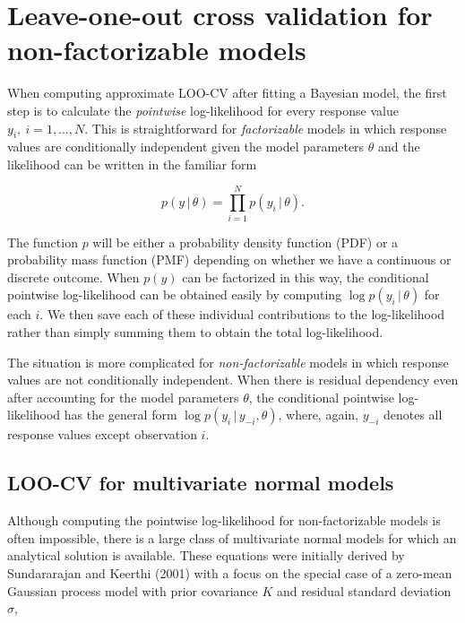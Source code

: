 \documentclass[english,,doc,floatsintext]{apa6}
\theoremstyle{definition}
\theoremstyle{definition}
\theoremstyle{definition}
\theoremstyle{remark}
\begin{document}
\hypertarget{nf-loo-cv}{%
\section{Leave-one-out cross validation for non-factorizable
models}\label{nf-loo-cv}}

When computing approximate LOO-CV after fitting a Bayesian model, the
first step is to calculate the \emph{pointwise} log-likelihood for every
response value \(y_i, \: i = 1, \ldots, N\). This is straightforward for
\emph{factorizable} models in which response values are conditionally
independent given the model parameters \(\theta\) and the likelihood can
be written in the familiar form

\begin{equation}
p(y \,|\, \theta) = \prod_{i=1}^N p(y_i \,|\, \theta).
\end{equation}

The function \(p\) will be either a probability density function (PDF)
or a probability mass function (PMF) depending on whether we have a
continuous or discrete outcome. When \(p(y)\) can be factorized in this
way, the conditional pointwise log-likelihood can be obtained easily by
computing \(\log p(y_i \,|\, \theta)\) for each \(i\). We then save each
of these individual contributions to the log-likelihood rather than
simply summing them to obtain the total log-likelihood.

The situation is more complicated for \emph{non-factorizable} models in
which response values are not conditionally independent. When there is
residual dependency even after accounting for the model parameters
\(\theta\), the conditional pointwise log-likelihood has the general
form \(\log p(y_i \,|\, y_{-i}, \theta)\), where, again, \(y_{-i}\)
denotes all response values except observation \(i\).

\hypertarget{loo-cv-for-multivariate-normal-models}{%
\subsection{LOO-CV for multivariate normal
models}\label{loo-cv-for-multivariate-normal-models}}

Although computing the pointwise log-likelihood for non-factorizable
models is often impossible, there is a large class of multivariate
normal models for which an analytical solution is available. These
equations were initially derived by Sundararajan and Keerthi (2001) with
a focus on the special case of a zero-mean Gaussian process model with
prior covariance \(K\) and residual standard deviation \(\sigma\),
\end{document}
